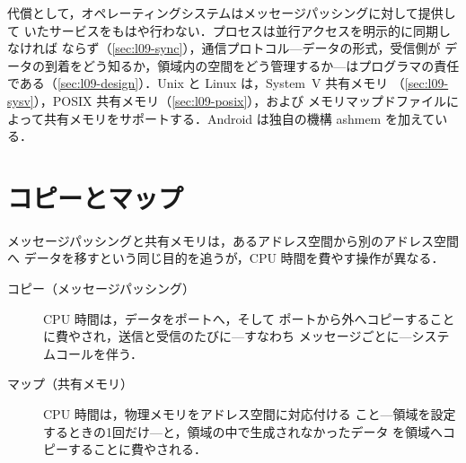 \documentclass[../main.tex]{subfiles}
\begin{document}
代償として，オペレーティングシステムはメッセージパッシングに対して提供して
いたサービスをもはや行わない．プロセスは並行アクセスを明示的に同期しなければ
ならず（\cref{sec:l09-sync}），通信プロトコル---データの形式，受信側が
データの到着をどう知るか，領域内の空間をどう管理するか---はプログラマの責任
である（\cref{sec:l09-design}）．Unix と Linux は，System~V 共有メモリ
（\cref{sec:l09-sysv}），POSIX 共有メモリ（\cref{sec:l09-posix}），および
メモリマップドファイルによって共有メモリをサポートする．Android は独自の機構
ashmem を加えている．

\section{コピーとマップ}
\label{sec:l09-copy-map}

メッセージパッシングと共有メモリは，あるアドレス空間から別のアドレス空間へ
データを移すという同じ目的を追うが，CPU 時間を費やす操作が異なる．
\begin{description}
  \item[コピー（メッセージパッシング）] CPU 時間は，データをポートへ，そして
    ポートから外へコピーすることに費やされ，送信と受信のたびに---すなわち
    メッセージごとに---システムコールを伴う．
  \item[マップ（共有メモリ）] CPU 時間は，物理メモリをアドレス空間に対応付ける
    こと---領域を設定するときの1回だけ---と，領域の中で生成されなかったデータ
    を領域へコピーすることに費やされる．
\end{description}
\end{document}
